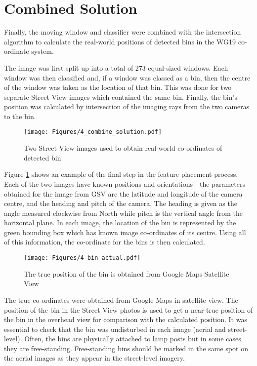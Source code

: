 \section{Combined Solution}
Finally, the moving window and classifier were combined with the intersection algorithm to calculate the real-world positions of detected bins in the WG19 co-ordinate system. 

The image was first split up into a total of 273 equal-sized windows. Each window was then classified and, if a window was classed as a bin, then the centre of the window was taken as the location of that bin. This was done for two separate Street View images which contained the same bin. Finally, the bin's position was calculated by intersection of the imaging rays from the two cameras to the bin.

\begin{figure}[H]
\centering
\texttt{[image: Figures/4\_combine\_solution.pdf]}
\decoRule
\caption[Final Solution]{Two Street View images used to obtain real-world co-ordinates of detected bin}
\label{fig:combined_solution_result}
\end{figure}

Figure \ref{fig:combined_solution_result} shows an example of the final step in the feature placement process. Each of the two images have known positions and orientations - the parameters obtained for the image from GSV are the latitude and longitude of the camera centre, and the heading and pitch of the camera. The heading is given as the angle measured clockwise from North while pitch is the vertical angle from the horizontal plane. In each image, the location of the bin is represented by the green bounding box which has known image co-ordinates of its centre. Using all of this information, the co-ordinate for the bins is then calculated.

\begin{figure}[H]
\centering
\texttt{[image: Figures/4\_bin\_actual.pdf]}
\decoRule
\caption[Point-and-click positioning]{The true position of the bin is obtained from Google Maps Satellite View}
\label{fig:bin_actual}
\end{figure}

The true co-ordinates were obtained from Google Maps in satellite view. The position of the bin in the Street View photos is used to get a near-true position of the bin in the overhead view for comparison with the calculated position. It was essential to check that the bin was undisturbed in each image (aerial and street-level). Often, the bins are physically attached to lamp posts but in some cases they are free-standing. Free-standing bins should be marked in the same spot on the aerial images as they appear in the street-level imagery. 

